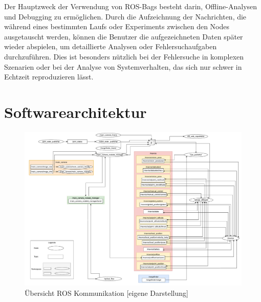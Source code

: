 \begin{description}
    Der Hauptzweck der Verwendung von ROS-Bags besteht darin, Offline-Analysen und Debugging zu ermöglichen. Durch die Aufzeichnung der Nachrichten, die während eines bestimmten Laufs oder Experiments zwischen den Nodes ausgetauscht werden, können die Benutzer die aufgezeichneten Daten später wieder abspielen, um detaillierte Analysen oder Fehlersuchaufgaben durchzuführen. Dies ist besonders nützlich bei der Fehlersuche in komplexen Szenarien oder bei der Analyse von Systemverhalten, das sich nur schwer in Echtzeit reproduzieren lässt.
\end{description}

\section{Softwarearchitektur}

    \begin{landscape}
        \begin{figure}
            \includegraphics[width=\paperwidth,keepaspectratio]{images/graph_ros.pdf}
            \caption[Übersicht ROS Kommunikation]{\label{img ros_communication} Übersicht ROS Kommunikation [eigene Darstellung]}
        \end{figure}
    \end{landscape}

